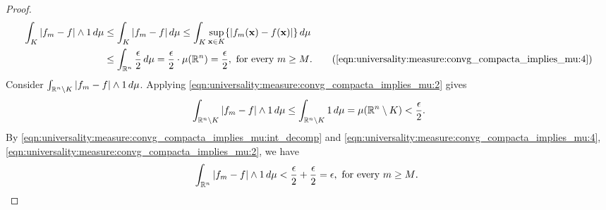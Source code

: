\begin{proof}
\begin{subequations}
\begin{align*}
    \int_{K} | f_m - f | \wedge 1 \, d\mu &\leq  \int_{K} | f_m - f |  \, d\mu \leq \int_{K} \sup_{\vec{x} \in K} \{ | f_m (\vec{x}) - f(\vec{x}) | \}\, d\mu \\
        &\leq \int_{\R^n} \frac{\epsilon}{2} \, d\mu = \frac{\epsilon}{2} \cdot \mu (\R^n) = \frac{\epsilon}{2}, \text{ for every $m \geq M$.}
     \tag{\ref{eqn:universality:measure:convg_compacta_implies_mu:4}} 
\end{align*}
\end{subequations}
Consider $\int_{{\mathbb R}^n \setminus K} | f_m - f | \wedge 1 \, d\mu$. Applying \ref{eqn:universality:measure:convg_compacta_implies_mu:2} gives \begin{align}
    \int_{{\mathbb R}^n \setminus K} | f_m - f | \wedge 1 \, d\mu \leq  \int_{{\mathbb R}^n \setminus K}  1 \, d\mu = \mu({\mathbb R}^n \setminus K) < \frac{\epsilon}{2}.
\end{align}
By \ref{eqn:universality:measure:convg_compacta_implies_mu:int_decomp} and \ref{eqn:universality:measure:convg_compacta_implies_mu:4}, \ref{eqn:universality:measure:convg_compacta_implies_mu:2}, we have \begin{align*}
    \int_{{\mathbb R}^n} | f_m - f | \wedge 1 \, d\mu  < \frac{\epsilon}{2} + \frac{\epsilon}{2} = \epsilon, \text{ for every $m \geq M$. }
\end{align*}
\end{proof}